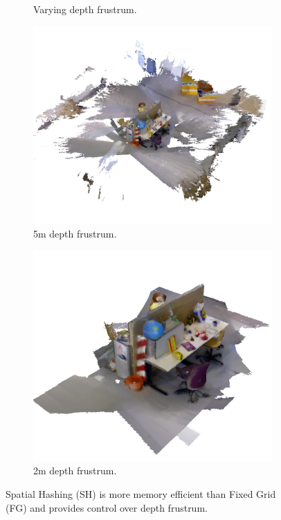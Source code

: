 \documentclass[conference]{IEEEtran}
\begin{document}
\begin{figure}[t!]
\begin{subfigure}[b]{0.22\linewidth}
			 \caption{Varying depth frustrum.} 
			 \label{fig:memory_data2}
		 \end{subfigure}
	  \begin{subfigure}[b]{0.27\linewidth} \centering 
		\includegraphics[width=1.0\textwidth]{img/freiburg_5m.png}
		 \caption{5m depth frustrum.}
		 \label{fig:freiburg_5m}
	 	\end{subfigure} 
 		\begin{subfigure}[b]{0.27\linewidth} \centering
		\includegraphics[width=1.0\textwidth]{img/freiburg_2m.png}
		 \caption{2m depth frustrum.} 
		 \label{fig:freiburg_2m}
	 \end{subfigure}
	 \caption{Spatial Hashing (SH) is more memory efficient than Fixed Grid (FG) and provides control over depth frustrum.}
\end{figure} 
\end{document}
